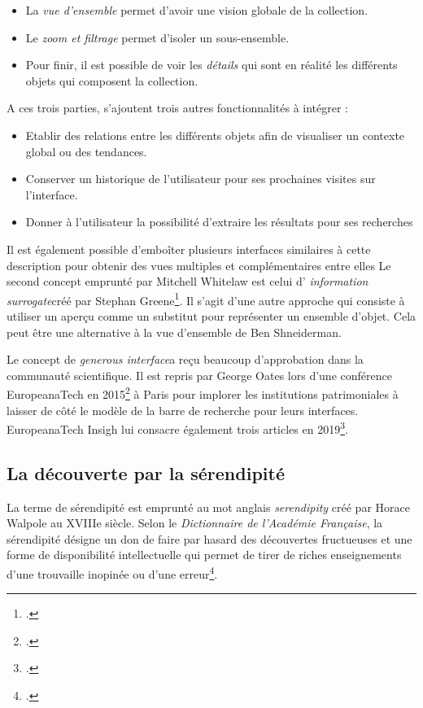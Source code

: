 \begin{itemize}
	\item La \textit{vue d'ensemble} permet d'avoir une vision globale de la collection.
	\item Le \textit{zoom et filtrage} permet d'isoler un sous-ensemble.
	\item Pour finir, il est possible de voir les \textit{détails} qui sont en réalité les différents objets qui composent la collection.
\end{itemize}
A ces trois parties, s'ajoutent trois autres fonctionnalités à intégrer : 

\begin{itemize}
	\item Etablir des relations entre les différents objets afin de visualiser un contexte global ou des tendances.
	\item Conserver un historique de l'utilisateur pour ses prochaines visites sur l'interface.
	\item Donner à l'utilisateur la possibilité d'extraire les résultats pour ses recherches
\end{itemize}
Il est également possible d'emboîter plusieurs interfaces similaires à cette description pour obtenir des vues multiples et complémentaires entre elles
Le second concept emprunté par Mitchell Whitelaw est celui d' \og \textit{information surrogate}\fg créé par Stephan
Greene\footcite{greenePreviewsOverviewsDigital2000}. Il s'agit d'une autre approche qui consiste à utiliser un aperçu comme un substitut pour représenter un ensemble d'objet. Cela peut être une alternative à la vue d'ensemble de Ben Shneiderman.

Le concept de \og \textit{generous interface}\fg a reçu beaucoup d'approbation dans la communauté scientifique. Il est repris par George Oates lors d'une conférence EuropeanaTech en 2015\footcite{EuropeanaTech2015} à Paris pour implorer les institutions patrimoniales à laisser de côté le modèle de la barre de recherche pour leurs interfaces. EuropeanaTech Insigh lui consacre également trois articles en 2019\footcite{Issue11Generous}.


\subsection{La découverte par la sérendipité}

La terme de sérendipité est emprunté au mot anglais \og \textit{serendipity} \fg créé par Horace Walpole au XVIIIe siècle. Selon le \textit{Dictionnaire de l'Académie Française}, la sérendipité désigne un \og don de faire par hasard des découvertes fructueuses \fg et \og une forme de disponibilité intellectuelle qui permet de tirer de riches enseignements d'une trouvaille inopinée ou d'une erreur\fg\footcite{SerendipiteAcademieFrancaise}.

